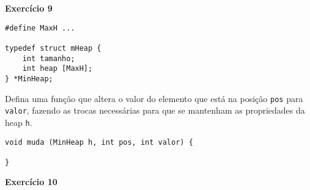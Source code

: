 \documentclass{article}
\begin{document}
\vspace{0.7cm}
\textbf{Exercício 9}
\begin{lstlisting}[style=mystyle]
#define MaxH ...

typedef struct mHeap {
    int tamanho;
    int heap [MaxH];
} *MinHeap;
\end{lstlisting}

Defina uma função que altera o valor do elemento que está na posição \texttt{pos} para \texttt{valor}, fazendo as trocas necessárias para que se mantenham as propriedades da heap \texttt{h}.
\begin{lstlisting}[style=mystyle]
void muda (MinHeap h, int pos, int valor) {

}
\end{lstlisting}


\vspace{0.7cm}
\textbf{Exercício 10}
\begin{lstlisting}[style=mystyle]
\end{lstlisting}


\begin{lstlisting}[style=mystyle]
\end{lstlisting}

\begin{lstlisting}[style=mystyle]
\end{lstlisting}

\begin{lstlisting}[style=mystyle]
\end{lstlisting}

\begin{lstlisting}[style=mystyle]
\end{lstlisting}

\begin{lstlisting}[style=mystyle]
\end{lstlisting}

\begin{lstlisting}[style=mystyle]
\end{lstlisting}
\end{document}
